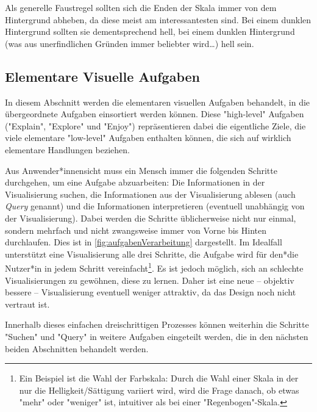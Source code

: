 			Als generelle Faustregel sollten sich die Enden der Skala immer von dem Hintergrund abheben, da diese meist am interessantesten sind. Bei einem dunklen Hintergrund sollten sie dementsprechend hell, bei einem dunklen Hintergrund (was aus unerfindlichen Gründen immer beliebter wird\dots) hell sein.

		\subsection{Elementare Visuelle Aufgaben}
			In diesem Abschnitt werden die elementaren visuellen Aufgaben behandelt, in die übergeordnete Aufgaben einsortiert werden können. Diese "high-level" Aufgaben ("Explain", "Explore" und "Enjoy") repräsentieren dabei die eigentliche Ziele, die viele elementare "low-level" Aufgaben enthalten können, die sich auf wirklich elementare Handlungen beziehen.

			Aus Anwender*innensicht muss ein Mensch immer die folgenden Schritte durchgehen, um eine Aufgabe abzuarbeiten: Die Informationen in der Visualisierung suchen, die Informationen aus der Visualisierung ablesen (auch \emph{Query} genannt) und die Informationen interpretieren (eventuell unabhängig von der Visualisierung). Dabei werden die Schritte üblicherweise nicht nur einmal, sondern mehrfach und nicht zwangsweise immer von Vorne bis Hinten durchlaufen. Dies ist in \autoref{fig:aufgabenVerarbeitung} dargestellt. Im Idealfall unterstützt eine Visualisierung alle drei Schritte, \dh die Aufgabe wird für den*die Nutzer*in in jedem Schritt vereinfacht\footnote{Ein Beispiel ist die Wahl der Farbskala: Durch die Wahl einer Skala in der nur die Helligkeit/Sättigung variiert wird, wird die Frage danach, ob etwas "mehr" oder "weniger" ist, intuitiver als bei einer "Regenbogen"-Skala.}. Es ist jedoch möglich, sich an schlechte Visualisierungen zu gewöhnen, \bzw diese zu lernen. Daher ist eine neue -- objektiv bessere -- Visualisierung eventuell weniger attraktiv, da das Design noch nicht vertraut ist.

			Innerhalb dieses einfachen dreischrittigen Prozesses können weiterhin die Schritte "Suchen" und "Query" in weitere Aufgaben eingeteilt werden, die in den nächsten beiden Abschnitten behandelt werden.

